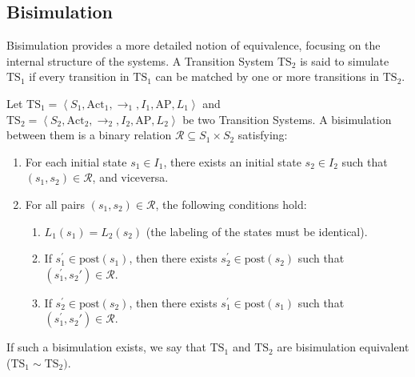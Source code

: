 \subsection{Bisimulation}
Bisimulation provides a more detailed notion of equivalence, focusing on the internal structure of the systems.
A Transition System $\text{TS}_2$  is said to simulate $\text{TS}_1$ if every transition in $\text{TS}_1$ can be matched by one or more transitions in $\text{TS}_2$.
\begin{definition}
    Let $\text{TS}_1=\left\langle S_1,\text{Act}_1,\rightarrow_1,I_1,\text{AP},L_1\right\rangle$ and \\ 
    $\text{TS}_2=\left\langle S_2,\text{Act}_2,\rightarrow_2,I_2,\text{AP},L_2\right\rangle$ be two Transition Systems.
    A bisimulation between them is a binary relation $\mathcal{R}\subseteq S_1\times S_2$ satisfying:
    \begin{enumerate}
        \item For each initial state $s_1\in I_1$, there exists an initial state $s_2\in I_2$ such that $(s_1,s_2)\in \mathcal{R}$, and viceversa. 
        \item For all pairs $(s_1,s_2)\in \mathcal{R}$, the following conditions hold: 
            \begin{enumerate}
                \item $L_1(s_1)=L_2(s_2)$ (the labeling of the states must be identical). 
                \item If $s_1^\prime\in\text{post}(s_1)$, then there exists $s_2^\prime\in\text{post}(s_2)$ such that $(s_1^\prime,s_2\prime)\in\mathcal{R}$. 
                \item If $s_2^\prime\in\text{post}(s_2)$, then there exists $s_1^\prime\in\text{post}(s_1)$ such that $(s_1^\prime,s_2\prime)\in\mathcal{R}$. 
            \end{enumerate}
    \end{enumerate}
    If such a bisimulation exists, we say that $\text{TS}_1$ and $\text{TS}_2$ are bisimulation equivalent ($\text{TS}_1\sim \text{TS}_2)$. 
\end{definition}

